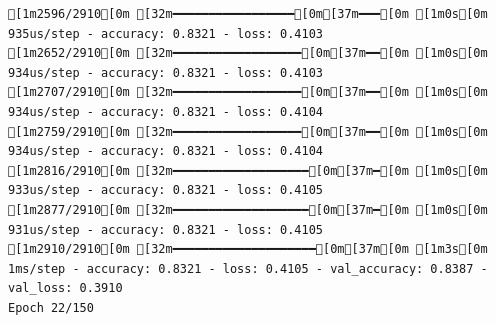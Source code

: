 \documentclass[
  letterpaper,
  DIV=11,
  numbers=noendperiod]{scrartcl}
\begin{document}
\begin{verbatim}
[1m2596/2910[0m [32m━━━━━━━━━━━━━━━━━[0m[37m━━━[0m [1m0s[0m 935us/step - accuracy: 0.8321 - loss: 0.4103
[1m2652/2910[0m [32m━━━━━━━━━━━━━━━━━━[0m[37m━━[0m [1m0s[0m 934us/step - accuracy: 0.8321 - loss: 0.4103
[1m2707/2910[0m [32m━━━━━━━━━━━━━━━━━━[0m[37m━━[0m [1m0s[0m 934us/step - accuracy: 0.8321 - loss: 0.4104
[1m2759/2910[0m [32m━━━━━━━━━━━━━━━━━━[0m[37m━━[0m [1m0s[0m 934us/step - accuracy: 0.8321 - loss: 0.4104
[1m2816/2910[0m [32m━━━━━━━━━━━━━━━━━━━[0m[37m━[0m [1m0s[0m 933us/step - accuracy: 0.8321 - loss: 0.4105
[1m2877/2910[0m [32m━━━━━━━━━━━━━━━━━━━[0m[37m━[0m [1m0s[0m 931us/step - accuracy: 0.8321 - loss: 0.4105
[1m2910/2910[0m [32m━━━━━━━━━━━━━━━━━━━━[0m[37m[0m [1m3s[0m 1ms/step - accuracy: 0.8321 - loss: 0.4105 - val_accuracy: 0.8387 - val_loss: 0.3910
Epoch 22/150


\end{verbatim}
\end{document}
